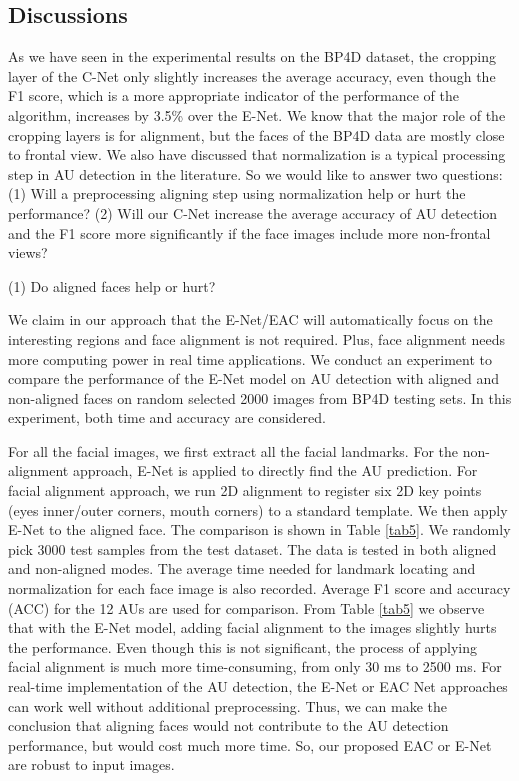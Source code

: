 \documentclass[a4paper, 10pt, conference]{ieeeconf}      %
\begin{document}
\subsection{Discussions}

As we have seen in the experimental results on the BP4D dataset, the cropping layer of the C-Net only slightly increases the average accuracy, even though the F1 score, which is a more appropriate indicator of the performance of the algorithm, increases by 3.5\% over the E-Net. We know that the major role of the cropping layers is for alignment, but the faces of the BP4D data are mostly close to frontal view. We also have discussed that normalization is a typical processing step in AU detection in the literature. So we would like to answer two questions: (1) Will a preprocessing aligning step using normalization help or hurt the performance? (2) Will our C-Net increase the average accuracy of AU detection and the F1 score more significantly if the face images include more non-frontal views?
  
(1) Do aligned faces help or hurt?

We claim in our approach that the E-Net/EAC will automatically focus on the interesting regions and face alignment is not required. Plus, face alignment needs more computing power in real time applications. We conduct an experiment to compare the performance of the E-Net model on AU detection with aligned and non-aligned faces on random selected 2000 images from BP4D testing sets. In this experiment, both time and accuracy are considered.

For all the facial images, we first extract all the facial landmarks. For the non-alignment approach, E-Net is applied to directly find the AU prediction. For facial alignment approach, we run 2D alignment to register six 2D key points (eyes inner/outer corners, mouth corners) to a standard template. We then apply E-Net to the aligned face. The comparison is shown in Table \ref{tab5}. We randomly pick 3000 test samples from the test dataset. The data is tested in both aligned and non-aligned modes. The average time needed for landmark locating and normalization for each face image is also recorded. Average F1 score and accuracy (ACC) for the 12 AUs are used for comparison. From Table \ref{tab5} we observe that with the E-Net model, adding facial alignment to the images slightly hurts the performance. Even though this is not significant, the process of applying facial alignment is much more time-consuming, from only 30 ms to 2500 ms. For real-time implementation of the AU detection, the E-Net or EAC Net approaches can work well without additional preprocessing. Thus, we can make the conclusion that aligning faces would not contribute to the AU detection performance, but would cost much more time. So, our proposed EAC or E-Net are robust to input images.
\end{document}
